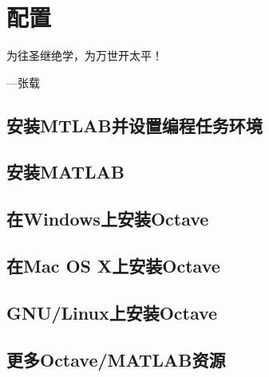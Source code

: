 \chapter{配置}

\begin{center}
为往圣继绝学，为万世开太平！
\end{center}

\begin{flushright}
---张载  
\end{flushright}

\section{安装MTLAB并设置编程任务环境}

\section{安装MATLAB}

\section{在Windows上安装Octave}

\section{在Mac OS X上安装Octave}

\section{GNU/Linux上安装Octave}

\section{更多Octave/MATLAB资源}